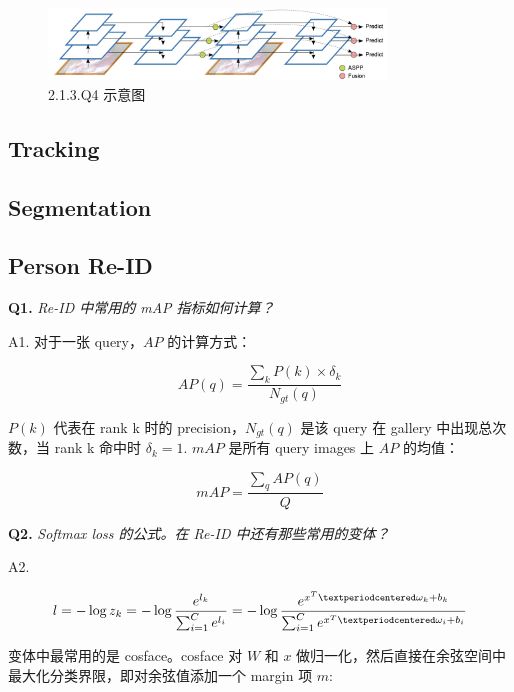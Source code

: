 \documentclass[cn,10pt,math=newtx,citestyle=gb7714-2015,bibstyle=gb7714-2015]{elegantbook}
\begin{document}
\begin{figure}[ht]
  \centering
  \includegraphics[width=0.8\textwidth]{image/2.1.3.q4.png}
  \caption{2.1.3.Q4 示意图}
\end{figure}


\subsection{Tracking}

\subsection{Segmentation}

\subsection{Person Re-ID}

\textbf{Q1.} \textit{Re-ID 中常用的 mAP 指标如何计算？}

A1. 对于一张 query，$AP$ 的计算方式：

\begin{equation}
AP(q)=\frac{\sum_{k} P(k) \times \delta_{k}}{N_{g t}(q)}
\end{equation}

$P(k)$ 代表在 rank k 时的 precision，$N_{g t}(q)$ 是该 query 在 gallery 中出现总次数，当 rank k 命中时 $\delta_{k}=1$. $mAP$ 是所有 query images 上 $AP$ 的均值：

\begin{equation}
mAP=\frac{\sum_{q} AP(q)}{Q}
\end{equation}

\textbf{Q2.} \textit{Softmax loss 的公式。在 Re-ID 中还有那些常用的变体？}

A2. 

\begin{equation}
l= -\log z_k=-\log \frac{e^{l_k}}{\sum_{i=1}^{C}{e^{l_i}}}=-\log \frac{e^{x^T·\omega_k+b_k}}{\sum_{i=1}^{C}{e^{x^T·\omega_i+b_i}}} \\
\end{equation}

变体中最常用的是 cosface。cosface 对 $W$ 和 $x$ 做归一化，然后直接在余弦空间中最大化分类界限，即对余弦值添加一个 margin 项 $m$:
\end{document}
